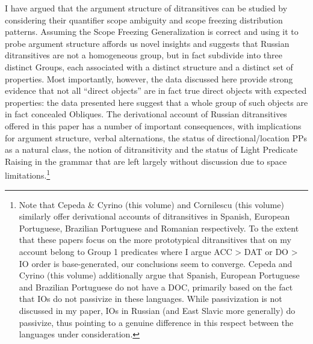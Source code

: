 \documentclass[output=paper,colorlinks,citecolor=brown]{./langscibook}
\begin{document}
I have argued that the argument structure of ditransitives can be studied by considering their quantifier scope ambiguity and scope freezing distribution patterns. Assuming the Scope Freezing Generalization is correct and using it to probe argument structure affords us novel insights and suggests that Russian ditransitives are not a homogeneous group, but in fact subdivide into three distinct Groups, each associated with a distinct structure and a distinct set of properties. Most importantly, however, the data discussed here provide strong evidence that not all “direct objects” are in fact true direct objects with expected properties: the data presented here suggest that a whole group of such objects are in fact concealed Obliques. The derivational account of Russian ditransitives offered in this paper has a number of important consequences, with implications for argument structure, verbal alternations, the status of directional/location PPs as a natural class, the notion of ditransitivity and the status of Light Predicate Raising in the grammar that are left largely without discussion due to space limitations.\footnote{Note that Cepeda \& Cyrino (this volume) and Cornilescu (this volume) similarly offer derivational accounts of ditransitives in Spanish, European Portuguese, Brazilian Portuguese and Romanian respectively. To the extent that these papers focus on the more prototypical ditransitives that on my account belong to Group 1 predicates where I argue ACC > DAT or DO > IO order is base-generated, our conclusions seem to converge. Cepeda and Cyrino (this volume) additionally argue that Spanish, European Portuguese and Brazilian Portuguese do not have a DOC, primarily based on the fact that IOs do not passivize in these languages. While passivization is not discussed in my paper, IOs in Russian (and East Slavic more generally) do passivize, thus pointing to a genuine difference in this respect between the languages under consideration.} 

\sloppy\printbibliography[heading=subbibliography,notkeyword=this]
\end{document}
